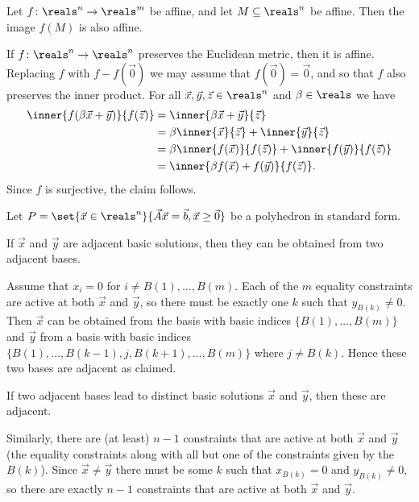 \documentclass[article, a4paper, 11pt, oneside]{memoir}
\numberwithin{equation}{chapter}
\theoremstyle{nonumberplain}
\newenvironment{displaytheorem}{%
	\begin{displayquote}\itshape%
}{%
	\end{displayquote}%
}
\begin{document}
\begin{remark}
    Let $f \colon \reals^n \to \reals^m$ be affine, and let $M \subseteq \reals^n$ be affine. Then the image $f(M)$ is also affine.
\end{remark}


\begin{remark}
    If $f \colon \reals^n \to \reals^n$ preserves the Euclidean metric, then it is affine. Replacing $f$ with $f - f(\vec{0})$ we may assume that $f(\vec{0}) = \vec{0}$, and so that $f$ also preserves the inner product. For all $\vec{x},\vec{y},\vec{z} \in \reals^n$ and $\beta \in \reals$ we have
    \begin{align*}
        \inner{f(\beta\vec{x} + \vec{y})}{f(\vec{z})}
            &= \inner{\beta\vec{x} + \vec{y}}{\vec{z}} \\
            &= \beta \inner{\vec{x}}{\vec{z}} + \inner{\vec{y}}{\vec{z}} \\
            &= \beta \inner{f(\vec{x})}{f(\vec{z})} + \inner{f(\vec{y})}{f(\vec{z})} \\
            &= \inner{\beta f(\vec{x}) + f(\vec{y})}{f(\vec{z})}.
    \end{align*}
    Since $f$ is surjective, the claim follows.
\end{remark}


\begin{remarkbreak}
    Let $P = \set{\vec{x} \in \reals^n}{\mat{A}\vec{x} = \vec{b}, \vec{x} \geq \vec{0}}$ be a polyhedron in standard form.
    \begin{displaytheorem}
        If $\vec{x}$ and $\vec{y}$ are adjacent basic solutions, then they can be obtained from two adjacent bases.
    \end{displaytheorem}
    Assume that $x_i = 0$ for $i \neq B(1), \ldots, B(m)$. Each of the $m$ equality constraints are active at both $\vec{x}$ and $\vec{y}$, so there must be exactly one $k$ such that $y_{B(k)} \neq 0$. Then $\vec{x}$ can be obtained from the basis with basic indices $\{B(1), \ldots, B(m)\}$ and $\vec{y}$ from a basis with basic indices $\{B(1), \ldots, B(k-1), j, B(k+1), \ldots, B(m)\}$ where $j \neq B(k)$. Hence these two bases are adjacent as claimed.

    \begin{displaytheorem}
        If two adjacent bases lead to distinct basic solutions $\vec{x}$ and $\vec{y}$, then these are adjacent.
    \end{displaytheorem}
    Similarly, there are (at least) $n-1$ constraints that are active at both $\vec{x}$ and $\vec{y}$ (the equality constraints along with all but one of the constraints given by the $B(k)$). Since $\vec{x} \neq \vec{y}$ there must be some $k$ such that $x_{B(k)} = 0$ and $y_{B(k)} \neq 0$, so there are exactly $n-1$ constraints that are active at both $\vec{x}$ and $\vec{y}$.
\end{remarkbreak}
\end{document}

